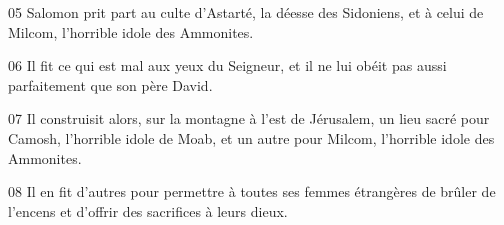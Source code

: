 
05 Salomon prit part au culte d’Astarté, la déesse des Sidoniens, et à celui de Milcom, l’horrible idole des Ammonites.

06 Il fit ce qui est mal aux yeux du Seigneur, et il ne lui obéit pas aussi parfaitement que son père David.

07 Il construisit alors, sur la montagne à l’est de Jérusalem, un lieu sacré pour Camosh, l’horrible idole de Moab, et un autre pour Milcom, l’horrible idole des Ammonites.

08 Il en fit d’autres pour permettre à toutes ses femmes étrangères de brûler de l’encens et d’offrir des sacrifices à leurs dieux.
